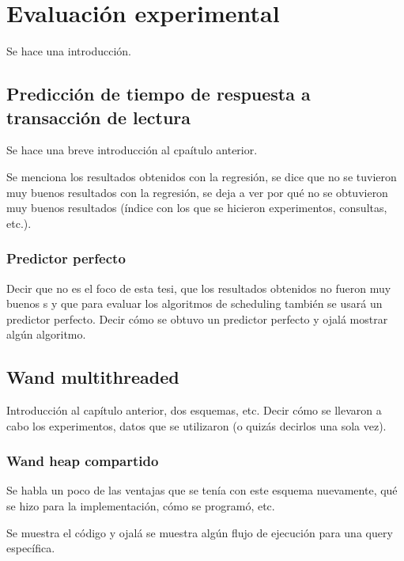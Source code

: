 \chapter{Evaluación experimental}
\label{cap:evaluacionexperimental}

Se hace una introducción.

\section{Predicción de tiempo de respuesta a transacción de lectura}
\label{evaluacionexperimental:ptrq}

Se hace una breve introducción al cpaítulo anterior. 

Se menciona los resultados obtenidos con la regresión, se dice que no se tuvieron muy buenos resultados con la regresión, se deja a ver por qué no se obtuvieron muy buenos resultados (índice con los que se hicieron experimentos, consultas, etc.).

\subsection{Predictor perfecto}
\label{evaluacionexperimental:predictorperfecto}

Decir que no es el foco de esta tesi, que los resultados obtenidos no fueron muy buenos s y que para evaluar los algoritmos de scheduling  también se usará un predictor perfecto. Decir cómo se obtuvo un predictor perfecto y ojalá mostrar algún algoritmo.


\section{Wand multithreaded}
\label{evaluacionexperimental:wm}

Introducción al capítulo anterior, dos esquemas, etc. Decir cómo se llevaron a cabo los experimentos, datos que se utilizaron (o quizás decirlos una sola vez). 


\subsection{Wand heap compartido}
\label{evaluacionexperimental:whc}

Se habla un poco de las ventajas que se tenía con este esquema nuevamente, qué se hizo para la implementación, cómo se programó, etc. 

Se muestra el código y ojalá se muestra algún flujo de ejecución para una query específica.


